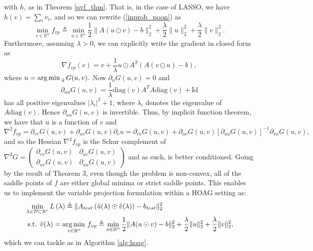 \documentclass[11pt, twoside]{report}
\begin{document}
with $h$, as in Theorem \ref{qvf_thm}. That is, in the case of LASSO, we have $h(v) = \sum_i v_i$, and so we can rewrite (\ref{inprob_poon}) as
\begin{equation} \label{noncvx_varpro_lasso}
    \min_{v \in \mathbb{R}^n} f_{vp} \triangleq \min_{u \in \mathbb{R}^n}{\frac{1}{2}\|A(u \odot v)-b\|_2^2 + \frac{\lambda}{2} \|u\|^2_2 + \frac{\lambda}{2} \|v\|_2^2}.
\end{equation}
Furthermore, assuming $\lambda > 0$, we can explicitly write the gradient in closed form as
\begin{equation*}
    \nabla f_{vp}(v)=v +\frac{1}{\lambda} u \odot A^T\left( A(v \odot u) - b\right),
\end{equation*}
where $u = \operatorname*{arg\, min \,}_{\tilde{u}} G(u,v). $ Now $\partial_u G(u,v) = 0$ and
\[\partial_{uu} G(u,v) = \frac{1}{\lambda} \mathrm{diag}(v)A^TA\mathrm{diag}(v) + \mathrm{Id}\]
has all positive eigenvalues $|\lambda_i|^2 + 1$, where $\lambda_i$ denotes the eigenvalue of $A\mathrm{diag}(v)$. Hence $\partial_{uu} G(u,v)$ is invertible. Thus, by implicit function theorem, we have that $u$ is a function of $v$ and
\begin{equation}\label{eq: fvphess}
    \nabla^2 f_{vp} = \partial_{vv} G(u,v) + \partial_{uv}G(u,v) \partial_v u = \partial_{vv} G(u,v) + \partial_{uv}G(u,v) [\partial_{uu}G(u,v)]^{-1}\partial_{vu}G(u,v),
\end{equation}
and so the Hessian $\nabla^2 f_{vp}$ is the Schur complement of 
$\nabla^2 G = 
\begin{pmatrix} 
\partial_{vv} G(u,v) & \partial_{uv} G(u,v) \\
\partial_{uv} G(u,v) & \partial_{uu} G(u,v)
\end{pmatrix}$
and as such, is better conditioned. Going by the result of Theorem 3\cite{poon}, even though the problem is non-convex, all of the saddle points of $f$ are either global minima or strict saddle points. This enables us to implement the variable projection formulation within a HOAG setting as:
\begin{align} 
&\min _{\lambda \in \mathcal{D} \subset \mathbb{R}^r} L\left(\lambda \right) \triangleq \|A_{test} \left(\hat{u}(\lambda) \odot \hat{v}(\lambda) \right) - b_{test}\|_2^2 \label{outprob_vp_poon}\\
&\text { s.t. } \hat{v}(\lambda) = \operatorname*{arg\, min \,}_{v \in \mathbb{R}^n} f_{vp} \triangleq \min_{u \in \mathbb{R}^n}{\frac{1}{2}\|A(u \odot v)-b\|_2^2 + \frac{\lambda}{2} \|u\|^2_2 + \frac{\lambda}{2} \|v\|_2^2}, \label{inprob_vp_poon}
\end{align}
which we can tackle as in Algorithm \ref{alg:hoag}. 
\end{document}
